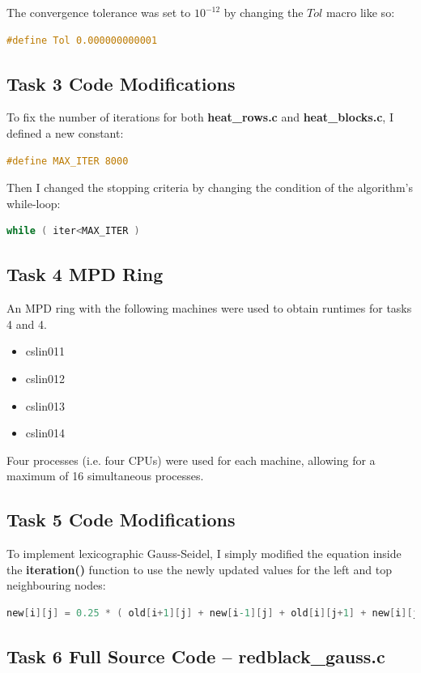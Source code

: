 \documentclass{article}
\begin{document}
The convergence tolerance was set to $10^{-12}$ by changing the $Tol$ macro like so:
\begin{lstlisting}[language=C]
#define Tol 0.000000000001
\end{lstlisting}

\subsection{Task 3 Code Modifications} 

To fix the number of iterations for both \textbf{heat\_rows.c} and \textbf{heat\_blocks.c}, I defined a new constant:
\begin{lstlisting}[language=C]
#define MAX_ITER 8000
\end{lstlisting}

Then I changed the stopping criteria by changing the condition of the algorithm's while-loop:
\begin{lstlisting}[language=C]
while ( iter<MAX_ITER )
\end{lstlisting}

\subsection{Task 4 MPD Ring}

An MPD ring with the following machines were used to obtain runtimes for tasks 4 and 4.
\begin{itemize}
	\item cslin011
	\item cslin012
	\item cslin013
	\item cslin014
\end{itemize}
Four processes (i.e. four CPUs) were used for each machine, allowing for a maximum of 16 simultaneous processes.

\subsection{Task 5 Code Modifications} 

To implement lexicographic Gauss-Seidel, I simply modified the equation inside the \textbf{iteration()} function to use the newly updated values for the left and top neighbouring nodes:
\begin{lstlisting}[language=C]
new[i][j] = 0.25 * ( old[i+1][j] + new[i-1][j] + old[i][j+1] + new[i][j-1] );
\end{lstlisting}

\subsection{Task 6 Full Source Code -- redblack\_gauss.c}
\end{document}
